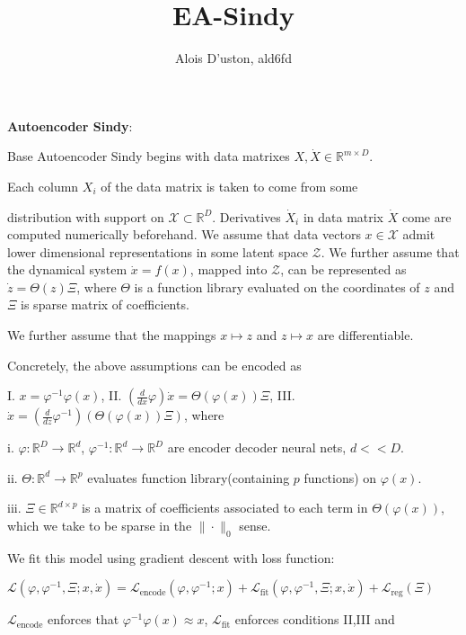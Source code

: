 \documentclass[11pt]{article}
\title{ EA-Sindy}
\author{Alois D'uston,  ald6fd}
\newcommand{\R}{\mathbb{R}}
\newcommand{\dd}[2]{\frac{d{#1}}{d{#2}}}
\newcommand{\tb}{\textbf}
\newcommand{\norm}[2]{\| #1 \|_{#2}}
\newcommand{\func}[3]{#1: #2\rightarrow#3}
\begin{document}
\maketitle


\tb{Autoencoder Sindy}:

Base Autoencoder Sindy begins with data matrixes $X,  \dot{X} \in \R^{m \times D}$. 

Each column $X_i$ of the data matrix is taken to come from some

 distribution  with support on $\mathcal{X}\subset \R^D$.  Derivatives $\dot{X}_i$ in  data matrix $\dot{X}$ come are computed numerically beforehand.  
 We assume that data vectors $x \in \mathcal{X}$ admit lower dimensional representations in some latent space  $\mathcal{Z}$.  We further assume that the dynamical system $\dot{x} = f(x)$,  mapped into  $\mathcal{Z}$, can be represented as $\dot{z} = \Theta(z)\Xi$,   where $\Theta$ is a function library evaluated on the coordinates of $z$ and $\Xi$ is sparse matrix of coefficients. 
 
  We further assume that the mappings $x \mapsto z$ and $z \mapsto x$ are differentiable. 

 Concretely,  the above assumptions can be encoded  as 
 
 
 
 I.  $x =  \varphi^{-1} \varphi(x)$, 
  II.  $(\dd{}{x}\varphi)  \dot{x} =   \Theta(\varphi(x))\Xi$,  
III. $\dot{x} = (\dd{}{z} \varphi^{-1})(\Theta(\varphi(x))\Xi)$, where 


i.  $\func{\varphi}{\R^D}{\R^d}$, $\func{\varphi^{-1}}{\R^d}{\R^D}$ are encoder decoder neural nets,  $d < < D$.

ii.  $\func{\Theta}{\R^d}{\R^p}$ evaluates function library(containing $p$ functions) on $\varphi(x)$.

iii.  $\Xi \in \R^{d \times p}$ is a matrix of   coefficients associated to each term in ${\Theta}(\varphi(x))$,  which we take to be sparse in the $\norm{\cdot}{0}$ sense.

We fit this model using gradient descent with loss function:

$\mathcal{L}(\varphi, \varphi^{-1},  \Xi ; x ,\dot{x}) = \mathcal{L}_\text{encode}(\varphi, \varphi^{-1}; x) + \mathcal{L}_\text{fit}(\varphi, \varphi^{-1},\Xi; x,\dot{x}) + \mathcal{L}_\text{reg}(\Xi)$

 $\mathcal{L}_\text{encode}$ enforces that $\varphi^{-1} \varphi(x) \approx  x$,  $\mathcal{L}_\text{fit}$ enforces conditions II,III and
\end{document}

